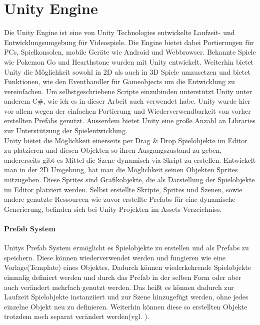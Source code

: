 \section{Unity Engine}
\label{ch:Grundlagen:sec:Unity}
Die Unity Engine ist eine von Unity Technologies entwickelte Laufzeit- und Entwicklungsumgebung für Videospiele. Die Engine bietet dabei Portierungen für PCs, Spielkonsolen, mobile Geräte wie Android und Webbrowser. Bekannte Spiele wie Pokemon Go und Hearthstone wurden mit Unity entwickelt. Weiterhin bietet Unity die Möglichkeit sowohl in 2D als auch in 3D Spiele umzusetzen und bietet Funktionen, wie den Eventhandler für Gameobjects um die Entwicklung zu vereinfachen. Um selbstgeschriebene Scripte einzubinden unterstützt Unity unter anderem C\#, wie ich es in dieser Arbeit auch verwendet habe. Unity wurde hier vor allem wegen der einfachen Portierung und Wiederverwendbarkeit von vorher erstellten Prefabs genutzt. Ausserdem bietet Unity eine große Anzahl an Libraries zur Unterstützung der Spielentwicklung. \\Unity bietet die Möglichkeit einerseits per Drag \& Drop Spielobjekte im Editor zu platzieren und diesen Objekten so ihren Ausgangszustand zu geben, andererseits gibt es Mittel die Szene dynamisch via Skript zu erstellen. Entwickelt man in der 2D Umgebung, hat man die Möglichkeit seinen Objekten Sprites mitzugeben. Diese Sprites sind Grafikobjekte, die als Darstellung der Spielobjekte im Editor platziert werden. Selbst erstellte Skripte, Sprites und Szenen, sowie andere genutzte Ressourcen wie zuvor erstellte Prefabs für eine dynamische Generierung, befinden sich bei Unity-Projekten im Assets-Verzeichniss.%

\paragraph{Prefab System}
\nocite{UPrefabs}
Unitys Prefab System ermöglicht es Spielobjekte zu erstellen und als Prefabs zu speichern. Diese können wiederverwendet werden und fungieren wie eine Vorlage(Template) eines Objektes. Dadurch können wiederkehrende Spielobjekte einmalig definiert werden und durch das Prefab in der selben Form oder aber auch verändert mehrfach genutzt werden. Das heißt es können dadurch zur Laufzeit Spielobjekte instanziiert und zur Szene hinzugefügt werden, ohne jedes einzelne Objekt neu zu definieren. Weiterhin können diese so erstellten Objekte trotzdem noch separat verändert werden(vgl. \cite{UPrefabs}).

